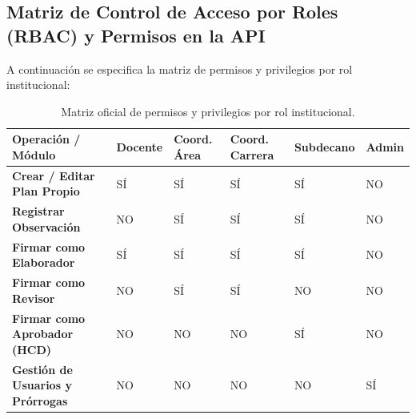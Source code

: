 \documentclass[12pt,a4paper]{article}
\begin{document}
\subsection{Matriz de Control de Acceso por Roles (RBAC) y Permisos en la API}
A continuación se especifica la matriz de permisos y privilegios por rol institucional:
\begin{table}[H]
\centering
\small
\renewcommand{\arraystretch}{1.2}
\begin{tabularx}{\textwidth}{|>{\hsize=1.5\hsize\raggedright\arraybackslash\bfseries\footnotesize}X|>{\hsize=0.9\hsize\centering\arraybackslash\footnotesize}X|>{\hsize=0.9\hsize\centering\arraybackslash\footnotesize}X|>{\hsize=0.9\hsize\centering\arraybackslash\footnotesize}X|>{\hsize=0.9\hsize\centering\arraybackslash\footnotesize}X|>{\hsize=0.9\hsize\centering\arraybackslash\footnotesize}X|}
\hline
\rowcolor{tableheader}
\textbf{Operación / Módulo} & \textbf{Docente} & \textbf{Coord. Área} & \textbf{Coord. Carrera} & \textbf{Subdecano} & \textbf{Admin} \\
\hline
Crear / Editar Plan Propio & SÍ & SÍ & SÍ & SÍ & NO \\
\hline
Registrar Observación & NO & SÍ & SÍ & SÍ & NO \\
\hline
Firmar como Elaborador & SÍ & SÍ & SÍ & SÍ & NO \\
\hline
Firmar como Revisor & NO & SÍ & SÍ & NO & NO \\
\hline
Firmar como Aprobador (HCD) & NO & NO & NO & SÍ & NO \\
\hline
Gestión de Usuarios y Prórrogas & NO & NO & NO & NO & SÍ \\
\hline
\end{tabularx}
\caption{Matriz oficial de permisos y privilegios por rol institucional.}
\label{tab:rbac_matrix}
\end{table}
\end{document}
